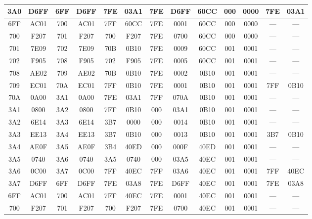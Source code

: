 \begin{flushleft}
\begin{tabular}{|c|c|c|c|c|c|c|c|c|c|c|c|c|}
		3A0 & D6FF & 6FF & D6FF & 7FE & 03A1 & 7FE & D6FF & 60CC & 000 & 0000 & 7FE & 03A1	\\
		\hline
		6FF & AC01 & 700 & AC01 & 7FF & 60CC & 7FE & 0001 & 60CC & 000 & 0000 & --- & ---	\\

		700 & F207 & 701 & F207 & 700 & F207 & 7FE & 0700 & 60CC & 000 & 0000 & --- & ---	\\

		701 & 7E09 & 702 & 7E09 & 70B & 0B10 & 7FE & 0009 & 60CC & 001 & 0001 & --- & ---	\\

		702 & F905 & 708 & F905 & 702 & F905 & 7FE & 0005 & 60CC & 001 & 0001 & --- & ---	\\

		708 & AE02 & 709 & AE02 & 70B & 0B10 & 7FE & 0002 & 0B10 & 001 & 0001 & --- & ---	\\

		709 & EC01 & 70A & EC01 & 7FF & 0B10 & 7FE & 0001 & 0B10 & 001 & 0001 & 7FF & 0B10	\\

		70A & 0A00 & 3A1 & 0A00 & 7FE & 03A1 & 7FF & 070A & 0B10 & 001 & 0001 & --- & ---	\\
		\hline
		3A1 & 0800 & 3A2 & 0800 & 7FF & 0B10 & 000 & 03A1 & 0B10 & 001 & 0001 & --- & ---	\\

		3A2 & 6E14 & 3A3 & 6E14 & 3B7 & 0000 & 000 & 0014 & 0B10 & 001 & 0001 & --- & ---	\\

		3A3 & EE13 & 3A4 & EE13 & 3B7 & 0B10 & 000 & 0013 & 0B10 & 001 & 0001 & 3B7 & 0B10	\\

		3A4 & AE0F & 3A5 & AE0F & 3B4 & 40ED & 000 & 000F & 40ED & 001 & 0001 & --- & ---	\\

		3A5 & 0740 & 3A6 & 0740 & 3A5 & 0740 & 000 & 03A5 & 40EC & 001 & 0001 & --- & ---	\\
		3A6 & 0C00 & 3A7 & 0C00 & 7FF & 40EC & 7FF & 03A6 & 40EC & 001 & 0001 & 7FF & 40EC	\\

		3A7 & D6FF & 6FF & D6FF & 7FE & 03A8 & 7FE & D6FF & 40EC & 001 & 0001 & 7FE & 03A8	\\

		\hline
		6FF & AC01 & 700 & AC01 & 7FF & 40EC & 7FE & 0001 & 40EC & 001 & 0001 & --- & ---	\\

		700 & F207 & 701 & F207 & 700 & F207 & 7FE & 0700 & 40EC & 001 & 0001 & --- & ---	\\


\end{tabular}
\end{flushleft}
